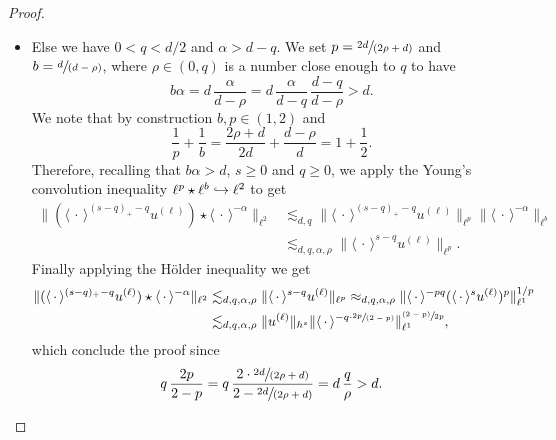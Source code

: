 \documentclass[JEP,XML,SOM,Unicode,NoEqCountersInSection,published]{cedram}
\newcommand\hto{\mathrel{\lhook\joinrel\to}}
\newcommand{\psfrac}[2]{\sfrac{(#1)}{#2}}
\newcommand{\spfrac}[2]{\sfrac{#1}{(#2)}}
\theoremstyle{definition}
\begin{document}
\begin{proof}
\begin{itemize}
\item
Else we have $0<q<d/2$ and $\alpha > d-q$. We set $p = \spfrac{2d}{2\rho+d}$ and $b = \spfrac{d}{d -\rho}$, where $\rho \in (0,q)$ is a number close enough to $q$ to have
\[
b \alpha = d \,\frac{\alpha}{d-\rho} = d \,\frac{\alpha}{d-q}\, \frac{d-q}{d-\rho} > d.
\]
We note that by construction $b,p\in (1,2)$ and
\[
\frac1p + \frac1b =\frac{2\rho+d}{2d} + \frac{d -\rho}{d} =1+\frac12.
\]
Therefore, recalling that $b\alpha >d$, $s\geq 0$ and $q\geq 0$, we apply the Young's convolution inequality $\ell^p \star \ell^b \hto \ell^2$ to get
\begin{equation*}
\begin{split}
\| (\langle \, \cdot\,\rangle^{(s-q)_+-q} u^{(\ell)}) \star \langle \, \cdot \, \rangle^{-\alpha} \|_{\ell^2} &\lesssim_{d,q} \| \langle \, \cdot\,\rangle^{(s-q)_+-q} u^{(\ell)}\|_{\ell^p} \|\langle \, \cdot \, \rangle^{-\alpha} \|_{\ell^b} \\ &\lesssim_{d,q,\alpha,\rho} \| \langle \, \cdot\,\rangle^{s-q} u^{(\ell)}\|_{\ell^p}.
\end{split}
\end{equation*}
Finally applying the Hölder inequality we get
\begin{equation*}
\begin{split}
\| (\langle \, \cdot\,\rangle^{(s-q)_+-q} u^{(\ell)}) \star \langle \, \cdot \, \rangle^{-\alpha} \|_{\ell^2} &\lesssim_{d,q,\alpha,\rho} \| \langle \, \cdot\,\rangle^{s-q} u^{(\ell)}\|_{\ell^p} \approx_{d,q,\alpha,\rho} \| \langle \, \cdot\,\rangle^{-pq} (\langle \, \cdot\,\rangle^{s} u^{(\ell)})^p\|_{\ell^1}^{1/p} \\
&\lesssim_{d,q,\alpha,\rho} \| u^{(\ell)} \|_{h^s} \| \langle \, \cdot\,\rangle^{-q\cdot \spfrac{2p}{2-p}} \|_{\ell^1}^{\psfrac{2-p}{2p}},
\end{split}
\end{equation*}
which conclude the proof since
\[
q\, \frac{2p}{2-p} = q\, \frac{2\cdot\spfrac{2d}{2\rho+d}}{2-\spfrac{2d}{2\rho+d}} = d\, \frac{q}{\rho} > d.\qedhere
\]
\end{itemize}
\end{proof}
\end{document}
